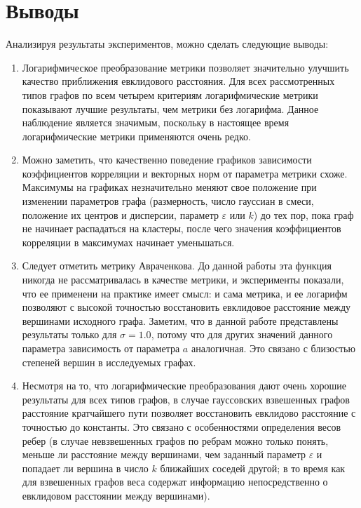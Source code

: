 \chapter*{Выводы}						%

Анализируя результаты экспериментов, можно сделать следующие выводы:
\begin{enumerate}

\item Логарифмическое преобразование метрики позволяет значительно улучшить качество приближения евклидового расстояния. Для всех рассмотренных типов графов по всем четырем критериям логарифмические метрики показывают лучшие результаты, чем метрики без логарифма. Данное наблюдение является значимым, поскольку в настоящее время логарифмические метрики применяются очень редко.

\item Можно заметить, что качественно поведение графиков зависимости коэффициентов корреляции и векторных норм от параметра метрики схоже. Максимумы на графиках незначительно меняют свое положение при изменении параметров графа (размерность, число гауссиан в смеси, положение их центров и дисперсии, параметр $\varepsilon$ или $k$) до тех пор, пока граф не начинает распадаться на кластеры, после чего значения коэффициентов корреляции в максимумах начинает уменьшаться.

\item Следует отметить метрику Авраченкова. До данной работы эта функция никогда не рассматривалась в качестве метрики, и эксперименты показали, что ее применени на практике имеет смысл: и сама метрика, и ее логарифм позволяют с высокой точностью восстановить евклидовое расстояние между вершинами исходного графа. Заметим, что в данной работе представлены результаты только для $\sigma=1.0$, потому что для других значений данного параметра зависимость от  параметра $a$ аналогичная. Это связано с близостью степеней вершин в исследуемых графах.

\item Несмотря на то, что логарифмические преобразования дают очень хорошие результаты для всех типов графов, в случае гауссовских взвешенных графов расстояние кратчайшего пути позволяет восстановить евклидово расстояние с точностью до константы. Это связано с особенностями определения весов ребер (в случае невзвешенных графов по ребрам можно только понять, меньше ли расстояние между вершинами, чем заданный параметр $\varepsilon$ и попадает ли вершина в число $k$ ближайших соседей другой; в то время как для взвешенных графов веса содержат информацию непосредственно о евклидовом расстоянии между вершинами).


\end{enumerate}

